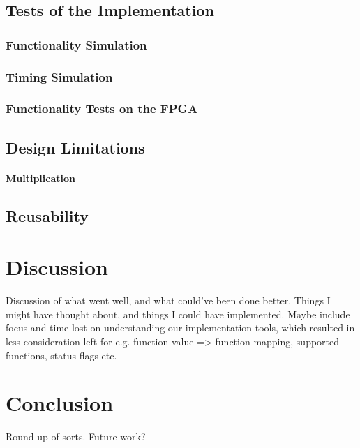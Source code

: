 \documentclass{article}
\begin{document}
\subsection{Tests of the Implementation}
\label{sec:tests}

\subsubsection{Functionality Simulation}
\label{subsec:funcsim}

\subsubsection{Timing Simulation}
\label{subsec:timingsim}

\subsubsection{Functionality Tests on the FPGA}
\label{subsec:funcfpga}

\subsection{Design Limitations}
\label{subsec:limitations}
\paragraph{Multiplication}

\subsection{Reusability}
\label{subsec:reusability}

\section{Discussion}
\label{sec:discussion}
Discussion of what went well, and what could've been done better. Things I might have thought about, and things I could have implemented. Maybe include focus and time lost on understanding our implementation tools, which resulted in less consideration left for e.g. function value => function mapping, supported functions, status flags etc.

\section{Conclusion}
\label{sec:conclusion}
Round-up of sorts. Future work?
\end{document}
